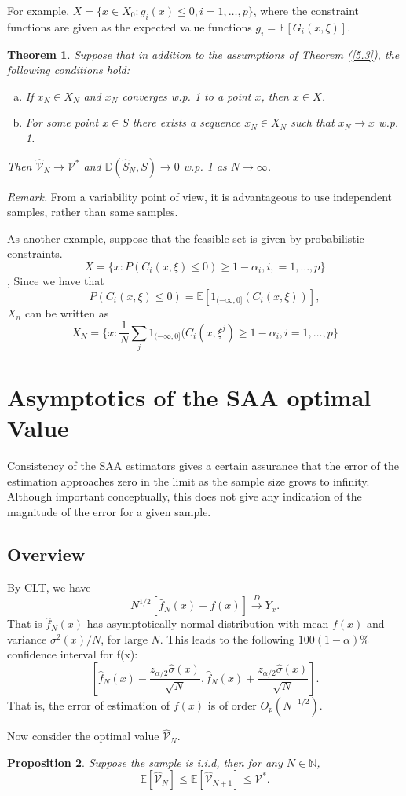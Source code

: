 \documentclass[a4pper,11pt]{article}
\newcommand{\be}{\mathbb E}
\newtheorem{thm}{Theorem}[section]
\newtheorem{prop}[thm]{Proposition}
\begin{document}
For example, $X=\{x\in X_0: g_i(x)\leq 0,i=1,\dots,p\}$, where the constraint functions are given as the expected value functions $g_i=\mathbb E [G_i(x,\xi)]$.
 \begin{thm}
 Suppose that in addition to the assumptions of Theorem (\ref{5.3}), the following conditions hold:
 \begin{enumerate}[(a)]
 	\item If $x_N\in X_N$ and $x_N$ converges w.p. 1 to a point $x$, then $x\in X$.
	\item For some point $x\in S$ there exists a sequence $x_N\in X_N$ such that $x_N\to x$ w.p. 1.
 \end{enumerate}
  Then  $\hat {\mathcal V}_N\to \mathcal V^*$ and $\mathbb D(\hat S_N,S)\to 0$ w.p. 1 as $N\to \infty$.
 \end{thm}
 \textit{Remark.} From a variability point of view, it is advantageous to use independent samples, rather than same samples.
 
As another example, suppose that the feasible set is given by probabilistic constraints.
$$
X=\{x: P(C_i(x,\xi)\leq 0)\geq 1-\alpha_i, i,=1,\dots,p\}
$$,
Since we have that 
$$
 P(C_i(x,\xi)\leq 0) = \mathbb E[1_{(-\infty,0]}(C_i(x,\xi))],
$$
$X_n$ can be written as
$$
X_N = \{x: \frac{1}{N}\sum_j 1_{(-\infty,0]}(C_i(x,\xi^j)\geq 1-\alpha_i,i=1,\dots,p\}
$$
\section{Asymptotics of the SAA optimal Value}
Consistency of the SAA estimators gives a certain assurance that the error of the estimation approaches zero in the limit as the sample size grows to infinity. Although important conceptually, this does not give any indication of the magnitude of the error for a given sample.
\subsection{Overview}
By CLT, we have 
$$N^{1/2}[\hat f_N(x)-f(x)]\stackrel{D}\to Y_x.
$$
That is $\hat f_N(x)$ has asymptotically normal distribution with mean $f(x)$ and variance $\sigma^2(x)/N$, for large $N$.  This leads to the following $100(1-\alpha)\%$ confidence interval for f(x):
$$
[\hat f_N(x)-\frac{z_{\alpha/2}\hat \sigma(x)}{\sqrt{N}},\hat f_N(x)+\frac{z_{\alpha/2}\hat \sigma(x)}{\sqrt{N}}].
$$
That is, the error of estimation of $f(x)$ is of order $O_p(N^{-1/2})$.

Now consider the optimal value $\hat{ \mathcal{V}}_N$. 
\begin{prop}
Suppose the sample is i.i.d, then for any $N\in \mathbb N$,
$$
\be[\hat {\mathcal V}_N]\leq \be [\hat {\mathcal V}_{N+1}]\leq \mathcal V^*.
$$
\end{prop}
\end{document}
